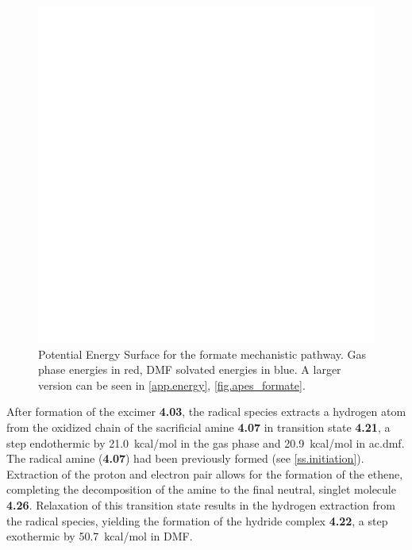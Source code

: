 \begin{figure}[!htb]
 \begin{center}
  \includegraphics[clip=true, width=140mm, keepaspectratio]{images/pes_formate.eps}
 \end{center}
\caption[Potential Energy Surface for the formate mechanistic pathway.]{Potential Energy Surface for the formate mechanistic pathway. Gas phase energies in red, DMF solvated energies in blue. A larger version can be seen in \autoref{app.energy}, \autoref{fig.apes_formate}.}
\label{fig.pes_formate}
\end{figure} 

After formation of the excimer \textbf{4.03}, the radical species extracts a hydrogen atom from the oxidized chain of the sacrificial amine \textbf{4.07} in transition state \textbf{4.21}, a step endothermic by 21.0~kcal/mol in the gas phase and 20.9~kcal/mol in \gls{ac.dmf}. The radical amine (\textbf{4.07}) had been previously formed (see \autoref{ss.initiation}). Extraction of the proton and electron pair allows for the formation of the ethene, completing the decomposition of the amine to the final neutral, singlet molecule \textbf{4.26}. Relaxation of this transition state results in the hydrogen extraction from the radical species, yielding the formation of the hydride complex \textbf{4.22}, a step exothermic by 50.7~kcal/mol in DMF.

